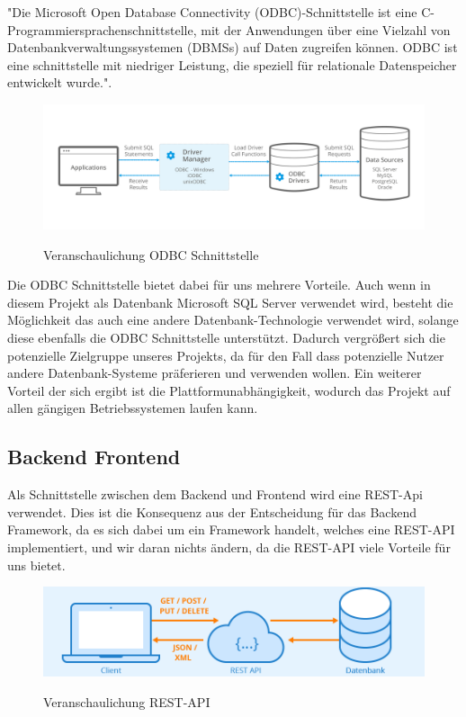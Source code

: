 \documentclass{article}
\begin{document}
    "Die Microsoft Open Database Connectivity (ODBC)-Schnittstelle ist eine C-Programmiersprachenschnittstelle, mit der Anwendungen über eine Vielzahl von Datenbankverwaltungssystemen (DBMSs) auf Daten zugreifen können. ODBC ist eine schnittstelle mit niedriger Leistung, die speziell für relationale Datenspeicher entwickelt wurde."\cite{MSODBC}.

    \begin{figure}[h]
        \centering
        \includegraphics[width= \textwidth]{images/odbc.png}
        \caption{Veranschaulichung ODBC Schnittstelle}
        \label{fig:beispiel}
        \cite{ODBC}
    \end{figure}

    Die ODBC Schnittstelle bietet dabei für uns mehrere Vorteile. Auch wenn in diesem Projekt als Datenbank Microsoft SQL Server verwendet wird, besteht die Möglichkeit das auch eine andere Datenbank-Technologie verwendet wird, solange diese ebenfalls die ODBC Schnittstelle unterstützt. Dadurch vergrößert sich die potenzielle Zielgruppe unseres Projekts, da für den Fall dass potenzielle Nutzer andere Datenbank-Systeme präferieren und verwenden wollen. Ein weiterer Vorteil der sich ergibt ist die Plattformunabhängigkeit, wodurch das Projekt auf allen gängigen Betriebssystemen laufen kann.
    

    
    \subsection{Backend Frontend}
    Als Schnittstelle zwischen dem Backend und Frontend wird eine REST-Api verwendet. Dies ist die Konsequenz aus der Entscheidung für das Backend Framework, da es sich dabei um ein Framework handelt, welches eine REST-API implementiert, und wir daran nichts ändern, da die REST-API viele Vorteile für uns bietet.

    \begin{figure}[h]
        \centering
        \includegraphics[width= \textwidth]{images/Rest-API.png}
        \caption{Veranschaulichung REST-API}
        \label{fig:beispiel}
        \cite{REST}
    \end{figure}
    
\end{document}
